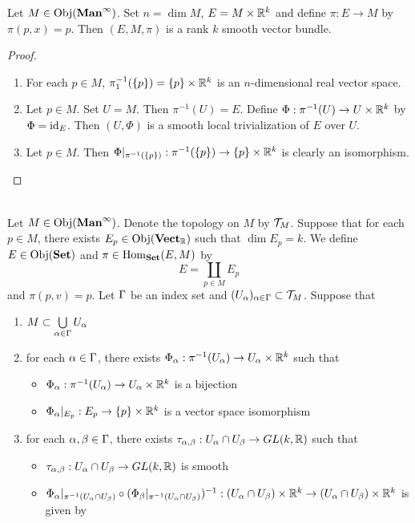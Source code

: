 \documentclass{book}
\begin{document}
\begin{ex}
Let $M \in \operatorname{Obj}(\operatorname*{\text{\textbf{Man}}^{\infty}})$. Set $n = \dim M$, $E = M \times \mathbb{R}^k$ and define $\pi: E \rightarrow M$ by $\pi(p, x) = p $. Then $(E, M, \pi)$ is a rank $k$ smooth vector bundle.
\end{ex}

\begin{proof}\
\begin{enumerate}
\item For each $p \in M$, $\pi_1^{-1}(\{p\}) = \{p\} \times \mathbb{R}^k$ is an $n$-dimensional real vector space.
\item Let $p \in M$. Set $U = M$. Then $\pi^{-1}(U) = E$. Define $\Phi: \pi^{-1}(U) \rightarrow U \times \mathbb{R}^k$ by $\Phi = \operatorname{id}_E$. Then $(U, \Phi)$ is a smooth local trivialization of $E$ over $U$.   
\item Let $p \in M$. Then $\Phi|_{\pi^{-1}(\{p\})}: \pi^{-1}(\{p\}) \rightarrow \{p\} \times \mathbb{R}^k$ is clearly an isomorphism. 
\end{enumerate}
\end{proof}


\begin{ex}  \\
	Let $M \in \operatorname{Obj}(\operatorname*{\text{\textbf{Man}}^{\infty}})$. Denote the topology on $M$ by $\mathcal{T}_M$. Suppose that for each $p \in M$, there exists $E_p \in \operatorname{Obj}(\operatorname*{\text{\textbf{Vect}}_{\mathbb{R}}})$ such that $\dim E_p = k$. We define $E \in \operatorname{Obj}(\operatorname*{\text{\textbf{Set}}})$ and $\pi \in \operatorname{Hom}_{\operatorname*{\text{\textbf{Set}}}}(E, M)$ by
	$$E = \coprod_{p \in M} E_p$$ 
	and 
	$\pi(p, v) = p$. Let $\Gamma$ be an index set and $(U_{\alpha})_{\alpha \in \Gamma} \subset \mathcal{T}_M$. Suppose that
	\begin{enumerate}
		\item $M \subset \bigcup\limits_{\alpha \in \Gamma} U_{\alpha}$
		\item for each $\alpha \in \Gamma$, there exists $\Phi_{\alpha}: \pi^{-1}(U_{\alpha}) \rightarrow U_{\alpha} \times \mathbb{R}^k$ such that 
		\begin{itemize}
			\item $\Phi_{\alpha} : \pi^{-1}(U_{\alpha}) \rightarrow U_{\alpha} \times \mathbb{R}^k$ is a bijection
			\item $\Phi_{\alpha}|_{E_p}:E_p \rightarrow \{p\} \times \mathbb{R}^k$ is a vector space isomorphism
		\end{itemize}
		\item for each $\alpha, \beta \in \Gamma$, there exists $\tau_{\alpha, \beta}: U_{\alpha} \cap U_{\beta} \rightarrow GL(k, \mathbb{R})$ such that 
		\begin{itemize}
			\item $\tau_{\alpha, \beta}: U_{\alpha} \cap U_{\beta} \rightarrow GL(k, \mathbb{R})$ is smooth
			\item $\Phi_{\alpha}|_{\pi^{-1}(U_{\alpha} \cap U_{\beta})} \circ (\Phi_{\beta}|_{\pi^{-1}(U_{\alpha} \cap U_{\beta})})^{-1}: (U_{\alpha} \cap U_{\beta}) \times \mathbb{R}^k \rightarrow (U_{\alpha} \cap U_{\beta}) \times \mathbb{R}^k$ is given by 
			$$$$
		\end{itemize}
	\end{enumerate}
	
\end{ex}
	
\end{document}
